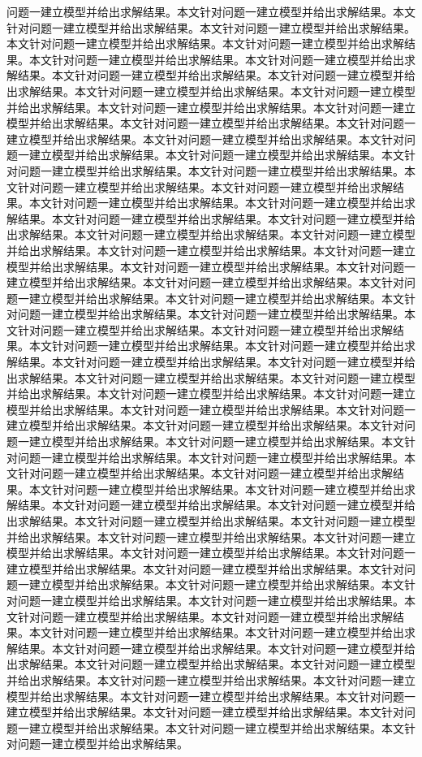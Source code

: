 问题一建立模型并给出求解结果。本文针对问题一建立模型并给出求解结果。本文针对问题一建立模型并给出求解结果。本文针对问题一建立模型并给出求解结果。本文针对问题一建立模型并给出求解结果。本文针对问题一建立模型并给出求解结果。本文针对问题一建立模型并给出求解结果。本文针对问题一建立模型并给出求解结果。本文针对问题一建立模型并给出求解结果。本文针对问题一建立模型并给出求解结果。本文针对问题一建立模型并给出求解结果。本文针对问题一建立模型并给出求解结果。本文针对问题一建立模型并给出求解结果。本文针对问题一建立模型并给出求解结果。本文针对问题一建立模型并给出求解结果。本文针对问题一建立模型并给出求解结果。本文针对问题一建立模型并给出求解结果。本文针对问题一建立模型并给出求解结果。本文针对问题一建立模型并给出求解结果。本文针对问题一建立模型并给出求解结果。本文针对问题一建立模型并给出求解结果。本文针对问题一建立模型并给出求解结果。本文针对问题一建立模型并给出求解结果。本文针对问题一建立模型并给出求解结果。本文针对问题一建立模型并给出求解结果。本文针对问题一建立模型并给出求解结果。本文针对问题一建立模型并给出求解结果。本文针对问题一建立模型并给出求解结果。本文针对问题一建立模型并给出求解结果。本文针对问题一建立模型并给出求解结果。本文针对问题一建立模型并给出求解结果。本文针对问题一建立模型并给出求解结果。本文针对问题一建立模型并给出求解结果。本文针对问题一建立模型并给出求解结果。本文针对问题一建立模型并给出求解结果。本文针对问题一建立模型并给出求解结果。本文针对问题一建立模型并给出求解结果。本文针对问题一建立模型并给出求解结果。本文针对问题一建立模型并给出求解结果。本文针对问题一建立模型并给出求解结果。本文针对问题一建立模型并给出求解结果。本文针对问题一建立模型并给出求解结果。本文针对问题一建立模型并给出求解结果。本文针对问题一建立模型并给出求解结果。本文针对问题一建立模型并给出求解结果。本文针对问题一建立模型并给出求解结果。本文针对问题一建立模型并给出求解结果。本文针对问题一建立模型并给出求解结果。本文针对问题一建立模型并给出求解结果。本文针对问题一建立模型并给出求解结果。本文针对问题一建立模型并给出求解结果。本文针对问题一建立模型并给出求解结果。本文针对问题一建立模型并给出求解结果。本文针对问题一建立模型并给出求解结果。本文针对问题一建立模型并给出求解结果。本文针对问题一建立模型并给出求解结果。本文针对问题一建立模型并给出求解结果。本文针对问题一建立模型并给出求解结果。本文针对问题一建立模型并给出求解结果。本文针对问题一建立模型并给出求解结果。本文针对问题一建立模型并给出求解结果。本文针对问题一建立模型并给出求解结果。本文针对问题一建立模型并给出求解结果。本文针对问题一建立模型并给出求解结果。本文针对问题一建立模型并给出求解结果。本文针对问题一建立模型并给出求解结果。本文针对问题一建立模型并给出求解结果。本文针对问题一建立模型并给出求解结果。本文针对问题一建立模型并给出求解结果。本文针对问题一建立模型并给出求解结果。本文针对问题一建立模型并给出求解结果。本文针对问题一建立模型并给出求解结果。本文针对问题一建立模型并给出求解结果。本文针对问题一建立模型并给出求解结果。本文针对问题一建立模型并给出求解结果。本文针对问题一建立模型并给出求解结果。本文针对问题一建立模型并给出求解结果。本文针对问题一建立模型并给出求解结果。本文针对问题一建立模型并给出求解结果。本文针对问题一建立模型并给出求解结果。本文针对问题一建立模型并给出求解结果。本文针对问题一建立模型并给出求解结果。本文针对问题一建立模型并给出求解结果。本文针对问题一建立模型并给出求解结果。本文针对问题一建立模型并给出求解结果。本文针对问题一建立模型并给出求解结果。本文针对问题一建立模型并给出求解结果。本文针对问题一建立模型并给出求解结果。